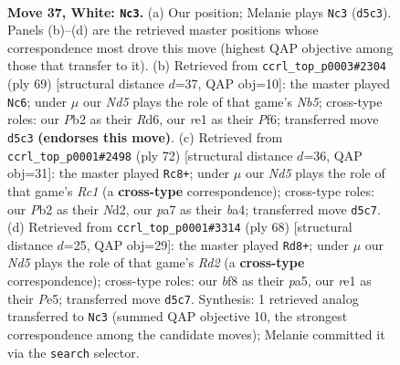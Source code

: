 \documentclass[11pt]{article}
\begin{document}
\clearpage

\begin{figure}[p]\centering
\begin{subfigure}{0.46\textwidth}\centering
\resizebox{\linewidth}{!}{%
\newchessgame
\chessboard[
  setfen={2r2b2/pp5k/6p1/3N1p1p/P7/6P1/RPP2PKP/4r3 w - - 0 37},
  showmover=false,
  pgfstyle=straightmove, color=movearrow, markmove={d5-c3}
]}
\caption{}
\end{subfigure}\hfill
\begin{subfigure}{0.46\textwidth}\centering
\resizebox{\linewidth}{!}{%
\newchessgame
\chessboard[
  setfen={8/2R1p3/3r1ppk/p6p/PnB5/5PP1/1P2K2P/8 b - - 9 35},
  showmover=false,
  pgfstyle=straightmove, color=movearrow, markmove={b4-c6}
]}
\caption{}
\end{subfigure}
\\[4pt]
\begin{subfigure}{0.46\textwidth}\centering
\resizebox{\linewidth}{!}{%
\newchessgame
\chessboard[
  setfen={5k2/pr4pp/5p2/8/b2p4/5PP1/1P1NPK1P/2R5 w - - 0 37},
  showmover=false,
  pgfstyle=straightmove, color=movearrow, markmove={c1-c8}
]}
\caption{}
\end{subfigure}\hfill
\begin{subfigure}{0.46\textwidth}\centering
\resizebox{\linewidth}{!}{%
\newchessgame
\chessboard[
  setfen={6k1/1r3p2/4p2p/p3P1p1/P7/6P1/1P1R1PKP/8 w - - 0 35},
  showmover=false,
  pgfstyle=straightmove, color=movearrow, markmove={d2-d8}
]}
\caption{}
\end{subfigure}
\caption{\textbf{Move 37, White: \texttt{Nc3}.} (a) Our position; Melanie plays \texttt{Nc3} (\texttt{d5c3}). Panels (b)--(d) are the retrieved master positions whose correspondence most drove this move (highest QAP objective among those that transfer to it). (b) Retrieved from \texttt{ccrl\_top\_p0003\#2304} (ply 69) [structural distance $d$=37, QAP obj=10]: the master played \texttt{Nc6}; under $\mu$ our \emph{Nd5} plays the role of that game's \emph{Nb5}; cross-type roles: our \emph{P}b2 as their \emph{R}d6, our \emph{r}e1 as their \emph{P}f6; transferred move \texttt{d5c3} \textbf{(endorses this move)}. (c) Retrieved from \texttt{ccrl\_top\_p0001\#2498} (ply 72) [structural distance $d$=36, QAP obj=31]: the master played \texttt{Rc8+}; under $\mu$ our \emph{Nd5} plays the role of that game's \emph{Rc1} (a \textbf{cross-type} correspondence); cross-type roles: our \emph{P}b2 as their \emph{N}d2, our \emph{p}a7 as their \emph{b}a4; transferred move \texttt{d5c7}. (d) Retrieved from \texttt{ccrl\_top\_p0001\#3314} (ply 68) [structural distance $d$=25, QAP obj=29]: the master played \texttt{Rd8+}; under $\mu$ our \emph{Nd5} plays the role of that game's \emph{Rd2} (a \textbf{cross-type} correspondence); cross-type roles: our \emph{b}f8 as their \emph{p}a5, our \emph{r}e1 as their \emph{P}e5; transferred move \texttt{d5c7}. Synthesis: 1 retrieved analog transferred to \texttt{Nc3} (summed QAP objective 10, the strongest correspondence among the candidate moves); Melanie committed it via the \texttt{search} selector.}
\label{fig:thought-m72}
\end{figure}
\end{document}
